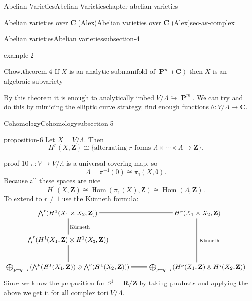 \documentclass[oneside,10pt,]{book}
\numberwithin{equation}{section}
\newcommand{\ZZ}{\mathbf{Z}}
\newcommand{\RR}{\mathbf{R}}
\newcommand{\CC}{\mathbf{C}}
\DeclareMathOperator{\Hom}{Hom}
\DeclareMathOperator{\PP}{\mathbf{P}}
\begin{document}
\begin{chapterptx}{Abelian Varieties}{}{Abelian Varieties}{}{}{chapter-abelian-varieties}
\begin{sectionptx}{Abelian varieties over \(\CC\) (Alex)}{}{Abelian varieties over \(\CC\) (Alex)}{}{}{sec-av-complex}
\begin{subsectionptx}{Abelian varieties}{}{Abelian varieties}{}{}{subsection-4}
\begin{example}{}{example-2}
\begin{itemize}[label=\textbullet]
\end{itemize}
%
\end{example}
\begin{theorem}{Chow.}{}{theorem-4}%
\hypertarget{p-52}{}%
If \(X\) is an analytic submanifold of \(\PP^n(\CC)\) then \(X\) is an algebraic subvariety.%
\end{theorem}
\hypertarget{p-53}{}%
By this theorem it is enough to analytically imbed \(V/\Lambda \hookrightarrow \PP^m\). We can try and do this by mimicing the \hyperref[def-supersing-isog-ec]{elliptic curve} strategy, find enough functions \(\theta \colon V/\Lambda \to \CC\).%
\end{subsectionptx}
%
%
\typeout{************************************************}
\typeout{************************************************}
%
\begin{subsectionptx}{Cohomology}{}{Cohomology}{}{}{subsection-5}
\begin{proposition}{}{}{proposition-6}%
\hypertarget{p-54}{}%
Let \(X = V/\Lambda\). Then%
\begin{equation*}
H^r (X,\ZZ) \cong \{\text{alternating }r\text{-forms } \Lambda\times\cdots\times\Lambda\to \ZZ\}\text{.}
\end{equation*}
%
\end{proposition}
\begin{proofptx}{}{proof-10}
\hypertarget{p-55}{}%
\(\pi\colon V\to V/\Lambda\) is a universal covering map, so%
\begin{equation*}
\Lambda = \pi^{-1} (0 ) \cong \pi_1(X,0)\text{.}
\end{equation*}
Because all these spaces are nice%
\begin{equation*}
H^1 (X,\ZZ) \cong \Hom(\pi_1(X), \ZZ) \cong \Hom(\Lambda, \ZZ)\text{.}
\end{equation*}
To extend to \(r \ne 1\) use the Künneth formula:%
\begin{equation*}
\xymatrix{
\bigwedge^r(H^1(X_1\times X_2, \ZZ)) \ar@{=}[r]\ar@{=}[d]^{\text{Künneth}} & H^r(X_1\times X_2 , \ZZ)\ar@{=}[dd]^{\text{Künneth}}\\
\bigwedge^r(H^1(X_1, \ZZ)\otimes H^1(X_2, \ZZ)) \ar@{=}[d]& \\
\bigoplus_{p+q=r}(\bigwedge^p(H^1(X_1, \ZZ))\otimes\bigwedge^q(H^1(X_2, \ZZ))) \ar@{=}[r] & \bigoplus_{p+q=r}(H^p(X_1, \ZZ)\otimes H^q(X_2, \ZZ))
}
\end{equation*}
Since we know the proposition for \(S^1 = \RR/\ZZ\) by taking products and applying the above we get it for all complex tori \(V/\Lambda\).%

\end{proofptx}
\end{subsectionptx}
\end{sectionptx}
\end{chapterptx}
\end{document}
